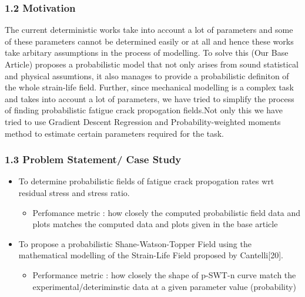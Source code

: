 \documentclass[11pt]{article}
\providecommand{\tightlist}{%
      \setlength{\itemsep}{0pt}\setlength{\parskip}{0pt}}
\begin{document}
\hypertarget{motivation}{%
\subsubsection{1.2 Motivation}\label{motivation}}

The current deterministic works take into account a lot of parameters
and some of these parameters cannot be determined easily or at all and
hence these works take arbitary assumptions in the process of modelling.
To solve this (Our Base Article) proposes a probabilistic model that not
only arises from sound statistical and physical assumtions, it also
manages to provide a probabilistic definiton of the whole strain-life
field. Further, since mechanical modelling is a complex task and takes
into account a lot of parameters, we have tried to simplify the process
of finding probabilistic fatigue crack propogation fields.Not only this
we have tried to use Gradient Descent Regression and
Probability-weighted moments method to estimate certain parameters
required for the task.

\hypertarget{problem-statement-case-study}{%
\subsubsection{1.3 Problem Statement/ Case
Study}\label{problem-statement-case-study}}

\begin{itemize}
\tightlist
\item
  To determine probabilistic fields of fatigue crack propogation rates
  wrt residual stress and stress ratio.

  \begin{itemize}
  \tightlist
  \item
    Perfomance metric : how closely the computed probabilistic field
    data and plots matches the computed data and plots given in the base
    article
  \end{itemize}
\item
  To propose a probabilistic Shane-Watson-Topper Field using the
  mathematical modelling of the Strain-Life Field proposed by
  Cantelli{[}20{]}.

  \begin{itemize}
  \tightlist
  \item
    Performance metric : how closely the shape of p-SWT-n curve match
    the experimental/deteriminstic data at a given parameter value
    (probability)
  \end{itemize}
\end{itemize}
\end{document}
